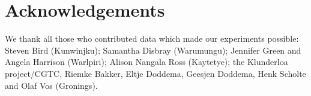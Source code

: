 \documentclass{article}
\begin{document}
\section{Acknowledgements}

We thank all those who contributed data which made our experiments possible: Steven Bird (Kunwinjku); Samantha Disbray (Warumungu); Jennifer Green and Angela Harrison (Warlpiri); Alison Nangala Ross (Kaytetye); the Klunderloa project/CGTC, Riemke Bakker, Eltje Doddema, Geesjen Doddema, Henk Scholte and Olaf Vos (Gronings).

\newpage



\end{document}
